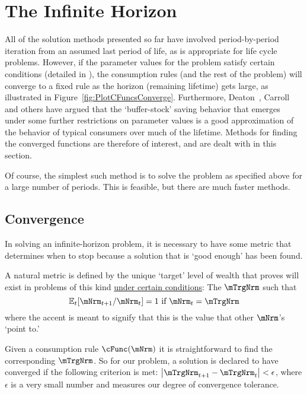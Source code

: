\documentclass[titlepage, headings=optiontotocandhead]{Resources/texmf-local/tex/latex/econtex}
\begin{document}
\hypertarget{the-infinite-horizon}{}
\section{The Infinite Horizon}\label{sec:the-infinite-horizon}

All of the solution methods presented so far have involved period-by-period iteration from an assumed last period of life, as is appropriate for life cycle problems.  However, if the parameter values for the problem satisfy certain conditions (detailed in \cite{BufferStockTheory}), the consumption rules (and the rest of the problem) will converge to a fixed rule as the horizon (remaining lifetime) gets large, as illustrated in Figure~\ref{fig:PlotCFuncsConverge}.  Furthermore, Deaton~\citeyearpar{deatonLiqConstr}, Carroll~\citeyearpar{carroll:brookings,carrollBSLCPIH} and others have argued that the `buffer-stock' saving behavior that emerges under some further restrictions on parameter values is a good approximation of the behavior of typical consumers over much of the lifetime.  Methods for finding the converged functions are therefore of interest, and are dealt with in this section.

Of course, the simplest such method is to solve the problem as
specified above for a large number of periods.  This is feasible, but
there are much faster methods.

\subsection{Convergence}

In solving an infinite-horizon problem, it is necessary to have some
metric that determines when to stop because a solution that is `good
enough' has been found.

A natural metric is defined by the unique `target' level of wealth that \cite{BufferStockTheory} proves
will exist in problems of this kind \href{https://llorracc.github.io/BufferStockTheory#GICNrm}{under certain conditions}: The $\mTrgNrm$ such that
\begin{equation}
  \Ex_t [{\mNrm}_{t+1}/\mNrm_t] = 1 \mbox{~if~} \mNrm_t = \mTrgNrm  \label{eq:mTrgNrmet}
\end{equation}
where the accent is meant to signify that this is the value
that other $\mNrm$'s `point to.'

Given a consumption rule $\cFunc(\mNrm)$ it is straightforward to find
the corresponding $\mTrgNrm$.  So for our problem, a solution is declared
to have converged if the following criterion is met:
$\left|\mTrgNrm_{t+1}-\mTrgNrm_{t}\right| < \epsilon$, where $\epsilon$ is
a very small number and measures our degree of convergence tolerance.
\end{document}
